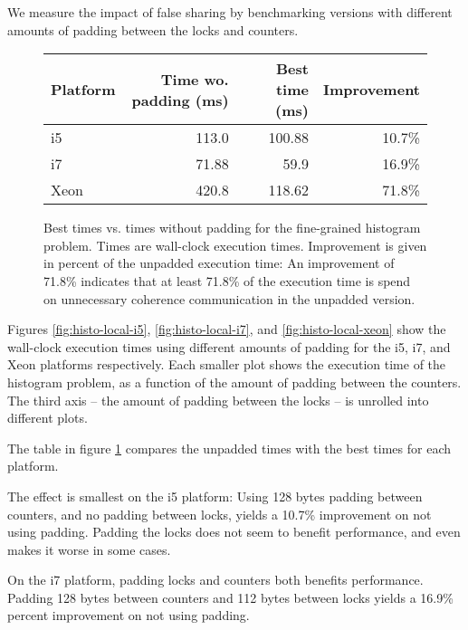 We measure the impact of false sharing by benchmarking versions with different
amounts of padding between the locks and counters.


\begin{figure}[hbtp]
	\centering
	\begin{tabular}{l r r r}
		\hline
		\hline
		Platform & Time wo. padding (ms) & Best time (ms) & Improvement \\
		\hline
		i5 & 113.0 & 100.88 & 10.7\% \\
		i7 & 71.88 & 59.9 & 16.9\% \\
		Xeon & 420.8 & 118.62 & 71.8\% \\
		\hline
		\hline
	\end{tabular}
	\caption{Best times vs. times without padding for the fine-grained
	histogram problem. Times are wall-clock execution times. Improvement is
	given in percent of the unpadded execution time: An improvement of
	71.8\% indicates that at least 71.8\% of the execution time is spend on
	unnecessary coherence communication in the unpadded version.}
	\label{table:hist-local}
\end{figure}

Figures \ref{fig:histo-local-i5}, \ref{fig:histo-local-i7}, and
\ref{fig:histo-local-xeon} show the wall-clock execution times using different
amounts of padding for the i5, i7, and Xeon platforms respectively. Each smaller
plot shows the execution time of the histogram problem, as a function of the
amount of padding between the counters. The third axis -- the amount of padding
between the locks -- is unrolled into different plots.

The table in figure \ref{table:hist-local} compares the unpadded times with the
best times for each platform.

The effect is smallest on the i5 platform: Using 128 bytes padding between
counters, and no padding between locks, yields a 10.7\% improvement on not using
padding. Padding the locks does not seem to benefit performance, and even makes
it worse in some cases.

On the i7 platform, padding locks and counters both benefits performance.
Padding 128 bytes between counters and 112 bytes between locks yields a 16.9\%
percent improvement on not using padding.

